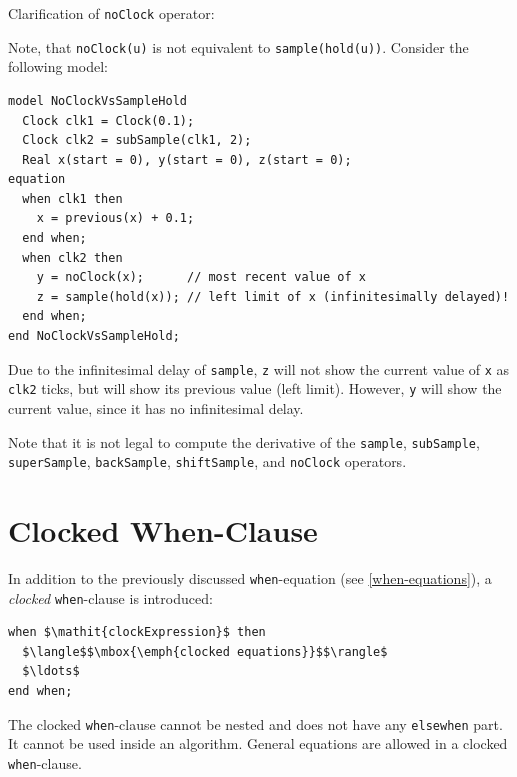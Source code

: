\begin{nonnormative}
Clarification of \lstinline!noClock! operator:

Note, that \lstinline!noClock(u)! is not equivalent to \lstinline!sample(hold(u))!.
Consider the following model:
\begin{lstlisting}[language=modelica]
model NoClockVsSampleHold
  Clock clk1 = Clock(0.1);
  Clock clk2 = subSample(clk1, 2);
  Real x(start = 0), y(start = 0), z(start = 0);
equation
  when clk1 then
    x = previous(x) + 0.1;
  end when;
  when clk2 then
    y = noClock(x);      // most recent value of x
    z = sample(hold(x)); // left limit of x (infinitesimally delayed)!
  end when;
end NoClockVsSampleHold;
\end{lstlisting}

Due to the infinitesimal delay of \lstinline!sample!, \lstinline!z! will not show the current value of \lstinline!x! as \lstinline!clk2! ticks, but will show its previous value (left limit).
However, \lstinline!y! will show the current value, since it has no infinitesimal delay.
\end{nonnormative}

Note that it is not legal to compute the derivative of the \lstinline!sample!, \lstinline!subSample!, \lstinline!superSample!, \lstinline!backSample!,
\lstinline!shiftSample!, and \lstinline!noClock! operators.

\section{Clocked When-Clause}\label{clocked-when-clause}

In addition to the previously discussed \lstinline!when!-equation (see \cref{when-equations}), a \emph{clocked} \lstinline!when!-clause is introduced:
\begin{lstlisting}[language=modelica]
when $\mathit{clockExpression}$ then
  $\langle$$\mbox{\emph{clocked equations}}$$\rangle$
  $\ldots$
end when;
\end{lstlisting}

The clocked \lstinline!when!-clause cannot be nested and does not have any \lstinline!elsewhen! part.
It cannot be used inside an algorithm.
General equations are allowed in a clocked \lstinline!when!-clause.

